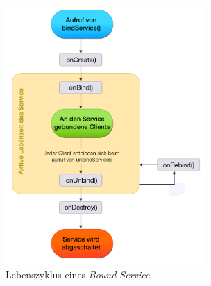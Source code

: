 \documentclass[]{report}
\begin{document}
\begin{figure}
    \centering 
    \includegraphics[width=3.0in]{bilder/boundservice.png}
    \caption{Lebenszyklus eines \textit{Bound Service}}
    \label{fig:lifetime}
\end{figure}
\end{document}
